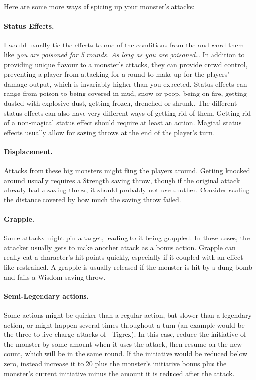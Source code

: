 Here are some more ways of spicing up your monster's attacks:
\paragraph{Status Effects.} I would usually tie the effects to one of the conditions from the \PHB{} and word them like \emph{you are poisoned for 5 rounds. As long as you are poisoned\ldots} In addition to providing unique flavour to a monster's attacks, they can provide crowd control, preventing a player from attacking for a round to make up for the players' damage output, which is invariably higher than you expected. Status effects can range from poison to being covered in mud, snow or poop, being on fire, getting dusted with explosive dust, getting frozen, drenched or shrunk. The different status effects can also have very different ways of getting rid of them. Getting rid of a non-magical status effect should require at least an action. Magical status effects usually allow for saving throws at the end of the player's turn.
\paragraph{Displacement.} Attacks from these big monsters might fling the players around. Getting knocked around usually requires a Strength saving throw, though if the original attack already had a saving throw, it should probably not use another. Consider scaling the distance covered by how much the saving throw failed.
\paragraph{Grapple.} Some attacks might pin a target, leading to it being grappled. In these cases, the attacker usually gets to make another attack as a bonus action. Grapple can really eat a character's hit points quickly, especially if it coupled with an effect like restrained. A grapple is usually released if the monster is hit by a dung bomb and fails a Wisdom saving throw.
\paragraph{Semi-Legendary actions.} Some actions might be quicker than a regular action, but slower than a legendary action, or might happen several times throughout a turn (an example would be the three to five charge attacks of ~Tigrex). In this case, reduce the initiative of the monster by some amount when it uses the attack, then resume on the new count, which will be in the same round. If the initiative would be reduced below zero, instead increase it to 20 plus the monster's initiative bonus plus the monster's current initiative minus the amount it is reduced after the attack.

